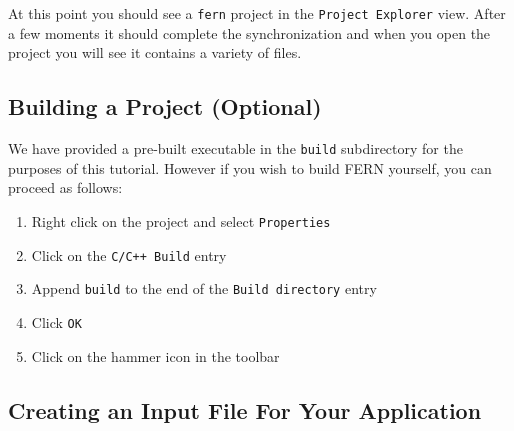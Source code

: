 At this point you should see a \texttt{fern} project in the \texttt{Project
Explorer} view. After a few moments it should complete the synchronization
and when you open the project you will see it contains a variety of files.

\subsection{Building a Project (Optional)}

We have provided a pre-built executable in the \texttt{build} subdirectory for
the purposes of this tutorial. However if you wish to build FERN yourself, you
can proceed as follows:

\begin{enumerate}
  \item Right click on the project and select \texttt{Properties}
  \item Click on the \texttt{C/C++ Build} entry
  \item Append \texttt{build} to the end of the \texttt{Build directory} entry
  \item Click \texttt{OK}
  \item Click on the hammer icon in the toolbar
\end{enumerate}

\subsection{Creating an Input File For Your Application}

